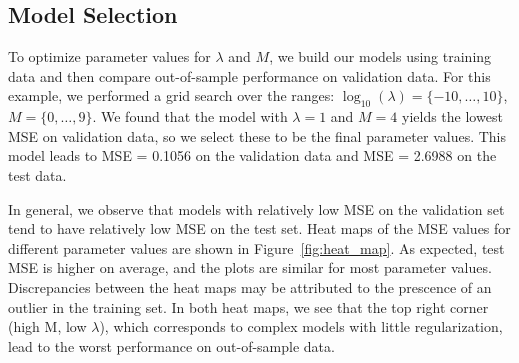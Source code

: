 \subsection{Model Selection}
To optimize parameter values for $\lambda$ and $M$, we build our models using training data and then compare out-of-sample performance on validation data.  For this example, we performed a grid search over the ranges: $\log_{10}(\lambda) = \{-10,\ldots,10\}$, $M = \{0,\ldots, 9\}$.  We found that the model with $\lambda = 1$ and $M = 4$ yields the lowest MSE on validation data, so we select these to be the final parameter values.  This model leads to MSE = 0.1056 on the validation data and MSE = 2.6988 on the test data.  

In general, we observe that models with relatively low MSE on the validation set tend to have relatively low MSE on the test set.  Heat maps of the MSE values for different parameter values are shown in Figure~\ref{fig:heat_map}.   As expected, test MSE is higher on average, and the plots are similar for most parameter values.  Discrepancies between the heat maps may be attributed to the prescence of an outlier in the training set.  In both heat maps, we see that the top right corner (high M, low $\lambda$), which corresponds to complex models with little regularization, lead to the worst performance on out-of-sample data.  

